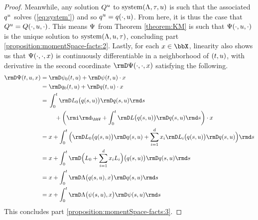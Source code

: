 \begin{proof}
  Meanwhile, any solution $Q^u$ to $\operatorname{system}(\Lambda,\tau,u)$ is such that the associated $q^u$ solves (\ref{eq:system'}) and so $q^u = q(\cdot,u)$.
  From here, it is thus the case that $Q^u = Q(\cdot,u,\cdot)$.
  This means $\Psi$ from Theorem \ref{theorem:KM} is such that $\Psi(\cdot,u,\cdot)$ is the unique solution to $\operatorname{system}(\Lambda,u,\tau)$, concluding part \ref{proposition:momentSpace-facts:2}.
  Lastly, for each $\stateVar\in\stateSpace$, linearity also shows us that $\Psi(\cdot,\cdot,x)$ is continuously differentiable in a neighborhood of $(t, u)$, with derivative in the second coordinate $\Der\aff(\cdot,\cdot,\stateVar)$ satisfying the following.
  \begin{align*}
    \Der\aff(t,\momentVar,\stateVar)
    &= \Der\affPart_0(t,\momentVar) + \Der\affPart(t,\momentVar)\cdot\stateVar \\
    &= \Der  q_0(t,\momentVar) + \Der q(t,\momentVar)\cdot\stateVar \\
    &= \begin{aligned}[t]
      &\int_0^t \Der \odePart_0\big(q(s,\momentVar)\big) \Der q(s,\momentVar) \rmd s \\
      &\quad+ \left(\id_\vecSpace + \int_0^t \Der \odePart\big(q(s,\momentVar)\big)\Der  q(s,\momentVar) \rmd s\right)\cdot\stateVar 
    \end{aligned} \\
    &= \stateVar + \int_0^t \Big( \Der \odePart_0\big(q(s,\momentVar) \big) \Der q(s,\momentVar) + \sum_{i=1}^d \stateVar_i \Der \odePart_i\big(q(s,\momentVar) \big) \Der q(s,\momentVar) \Big) \rmd s \\
    &= \stateVar + \int_0^t \Der \Big( \odePart_0 + \sum_{i=1}^d \stateVar_i \odePart_i \Big)\big(q(s,\momentVar)\big) \Der q(s,\momentVar)  \rmd s \\
    &= \stateVar + \int_0^t \Der \ode\big(q(s,\momentVar), \stateVar\big) \Der q(s,\momentVar)  \rmd s \\
    &= \stateVar + \int_0^t \Der \ode\big(\affPart(s,\momentVar), \stateVar\big) \Der \affPart(s,\momentVar) \rmd s 
  \end{align*}
  This concludes part \ref{proposition:momentSpace-facts:3}.
\end{proof}
